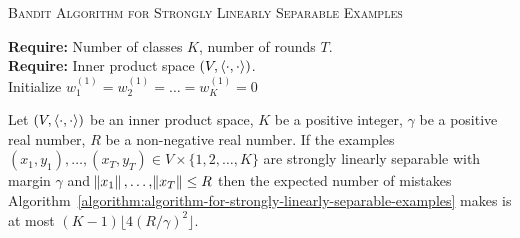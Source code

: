 \begin{algorithm}[h]
\SetAlgoLined
\LinesNumbered
\caption{\textsc{Bandit Algorithm for Strongly Linearly Separable Examples}
\label{algorithm:algorithm-for-strongly-linearly-separable-examples}}
\textbf{Require:} Number of classes $K$, number of rounds $T$. \\
\textbf{Require:} Inner product space $(V,\left\langle \cdot, \cdot \right\rangle)$.  \\
\nl Initialize $w_1^{(1)} = w_2^{(1)} = \dots = w_K^{(1)} = 0$\\ 
\nl {}

\end{algorithm}

\begin{theorem}
\label{theorem:strongly-separable-examples-mistake-upper-bound}
Let $(V, \left\langle \cdot, \cdot \right\rangle)$ be an inner product space, $K$ be a positive
integer, $\gamma$ be a positive real number, $R$ be a non-negative real number.
If the examples $(x_1, y_1), \dots, (x_T, y_T) \in V \times
\{1,2,\dots,K\}$ are strongly linearly separable with margin $\gamma$ and 
$\norm{x_1}, \dots, \norm{x_T} \le R$
then the expected number
of mistakes
Algorithm~\ref{algorithm:algorithm-for-strongly-linearly-separable-examples}
makes is at most $(K-1) \lfloor 4(R/\gamma)^2 \rfloor$.
\end{theorem}

